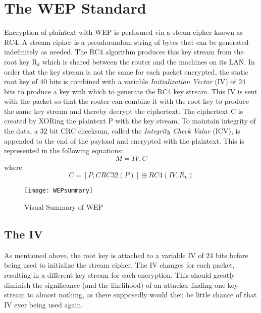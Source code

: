 \documentclass[12pt]{article}
\begin{document}
\newpage
\section{The WEP Standard}
\label{sec:wep}
Encryption of plaintext with WEP is performed via a steam cipher known as RC4.  A stream cipher is a pseudorandom string of bytes that can be generated indefinitely as needed.  The RC4 algorithm produces this key stream from the root key R$_{k}$ which is shared between the router and the machines on its LAN.  In order that the key stream is not the same for each packet encrypted, the static root key of 40 bits  is combined with a variable \textit{Initialization Vector} (IV) of 24 bits to produce a key with which to generate the RC4 key stream.  This IV is sent with the packet so that the router can combine it with the root key to produce the same key stream and thereby decrypt the ciphertext.  The ciphertext C is created by XORing the plaintext P with the key stream.  To maintain integrity of the data, a 32 bit CRC checksum, called the \textit{Integrity Check Value} (ICV), is appended to the end of the payload and encrypted with the plaintext. This is represented in the following equations:
\[M = IV,C\]
where \[C = [P,CRC32(P)] \oplus RC4(IV,R_k) \]
\begin{figure} [h]
\centering
\texttt{[image: WEPsummary]}
\caption{Visual Summary of WEP}
\label{fig:WEPsummary}
\end{figure}

\subsection{The IV}
As mentioned above, the root key is attached to a variable IV of 24 bits before being used to initialize the stream cipher.  The IV changes for each packet, resulting in a different key stream for each encryption.  This should greatly diminish the significance (and the likelihood) of an attacker finding one key stream to almost nothing, as there supposedly would then be little chance of that IV ever being used again.
\end{document}
